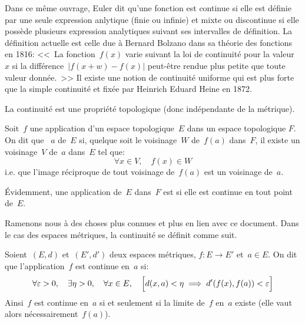 \begin{histoire}
Dans ce même ouvrage, Euler
dit qu'une fonction est continue si elle est définie par une seule expression anlytique
(finie ou infinie) et mixte ou discontinue si elle possède plusieurs expression analytiques
suivant ses intervalles de définition.
\medskip
La définition actuelle est celle due à Bernard Bolzano
 dans sa théorie des
fonctions en 1816: <<~La fonction~$f(x)$ varie suivant la loi de continuité pour la valeur~$x$
si la différence~$| f(x + w) -f(x) |$ peut-être rendue plus petite que toute valeur donnée.~>>
Il existe une notion de continuité uniforme qui est plus forte que la simple continuité
et fixée par Heinrich Eduard Heine
 en 1872.
\end{histoire}


\medskip
La continuité est une propriété topologique (donc indépendante de la métrique).

\medskip
\begin{definition}
Soit~$f$ une application d'un espace topologique~$E$ dans un espace topologique
$F$.
On dit que ~$a$ de~$E$ si, quelque
soit le voisinage~$W$ de~$f(a)$ dans~$F$, il existe un voisinage~$V$ de~$a$ dans~$E$
tel que:
\begin{equation}
\forall x\in V, \quad f(x)\in W
\end{equation}
i.e. que l'image réciproque de tout voisinage de~$f(a)$ est un voisinage de~$a$.
\end{definition}


\medskip
Évidemment, une application de~$E$ dans~$F$ est  si
elle est continue en tout point de~$E$.

\medskip
Ramenons nous à des choses plus connues et plus en lien avec ce document.
Dans le cas des espaces métriques, la continuité se définit comme suit.

\begin{definition}
Soient~$(E,d)$ et~$(E',d')$ deux espaces métriques, $f: E \to E'$ et~$a \in E$.
On dit que l'application~$f$ est continue en~$a$ si:
\begin{equation}
  \forall \varepsilon > 0, \quad \exists \eta > 0, \quad \forall x \in E, \quad \Bigl[d(x,a)<\eta \implies d'(f(x),f(a))<\varepsilon\Bigr]
\end{equation}
Ainsi~$f$ est continue en~$a$ si et seulement si la limite de~$f$ en~$a$ existe
(elle vaut alors nécessairement~$f(a)$).
\end{definition}

